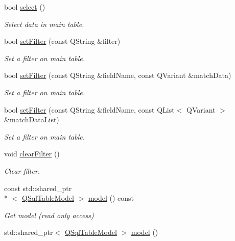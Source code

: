 \begin{DoxyCompactItemize}
bool \hyperlink{classmdt_abstract_sql_table_controller_ae26ede862ac54ece9243b264ea22cefb}{select} ()
\begin{DoxyCompactList}\small\item\em Select data in main table. \end{DoxyCompactList}\item 
bool \hyperlink{classmdt_abstract_sql_table_controller_a28b24065dc465fdc0944464708adf63f}{set\-Filter} (const Q\-String \&filter)
\begin{DoxyCompactList}\small\item\em Set a filter on main table. \end{DoxyCompactList}\item 
bool \hyperlink{classmdt_abstract_sql_table_controller_aab3bc0fe028e133fe3f79a16907b41f5}{set\-Filter} (const Q\-String \&field\-Name, const Q\-Variant \&match\-Data)
\begin{DoxyCompactList}\small\item\em Set a filter on main table. \end{DoxyCompactList}\item 
bool \hyperlink{classmdt_abstract_sql_table_controller_a82ae302ef502e3982b454b0792932df0}{set\-Filter} (const Q\-String \&field\-Name, const Q\-List$<$ Q\-Variant $>$ \&match\-Data\-List)
\begin{DoxyCompactList}\small\item\em Set a filter on main table. \end{DoxyCompactList}\item 
void \hyperlink{classmdt_abstract_sql_table_controller_a22a263d8c0bb0f85fc9803f65491c436}{clear\-Filter} ()
\begin{DoxyCompactList}\small\item\em Clear filter. \end{DoxyCompactList}\item 
const std\-::shared\-\_\-ptr\\*
$<$ \hyperlink{class_q_sql_table_model}{Q\-Sql\-Table\-Model} $>$ \hyperlink{classmdt_abstract_sql_table_controller_a75eb50d92dcdce1282162cd438b136ad}{model} () const 
\begin{DoxyCompactList}\small\item\em Get model (read only access) \end{DoxyCompactList}\item 
std\-::shared\-\_\-ptr$<$ \hyperlink{class_q_sql_table_model}{Q\-Sql\-Table\-Model} $>$ \hyperlink{classmdt_abstract_sql_table_controller_a8b9b7c1931a41357d2719bd299b01762}{model} ()

\end{DoxyCompactItemize}
